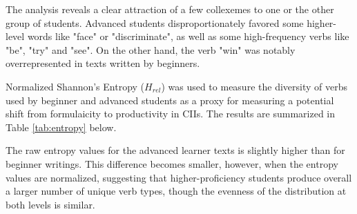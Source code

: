 The analysis reveals a clear attraction of a few collexemes to one or the other group of students.
Advanced students disproportionately favored some higher-level words like "face" or "discriminate", as well as some high-frequency verbs like "be", "try" and "see". 
On the other hand, the verb "win" was notably overrepresented in texts written by beginners.



Normalized Shannon's Entropy ($H_{rel}$) was used to measure the diversity of verbs used by beginner and advanced students as a proxy for measuring a potential shift from formulaicity to productivity in CIIs.
The results are summarized in Table \ref{tab:entropy} below.



The raw entropy values for the advanced learner texts is slightly higher than for beginner writings.
This difference becomes smaller, however, when the entropy values are normalized, suggesting that higher-proficiency students produce overall a larger number of unique verb types, 
though the evenness of the distribution at both levels is similar.

